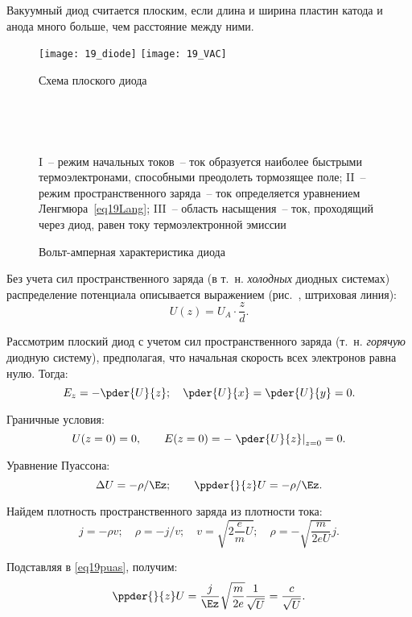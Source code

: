 
Вакуумный диод считается плоским, если длина и ширина пластин катода и анода
много больше, чем расстояние между ними.
\begin{figure}[h!]
  \center
  \texttt{[image: 19\_diode]} \hspace{1em}
  \texttt{[image: 19\_VAC]} \\
  \parbox{.3\textwidth}{\caption{Схема плоского диода} \label{pic19diode}}
    \hspace{1em}
  \parbox{.45\textwidth}{\caption{Вольт-амперная характеристика диода}
    \label{pic19VAC}} \\
  \parbox{.35\textwidth}{\ } \hspace{1em}
  \parbox{.6\textwidth}{\footnotesize I~-- режим начальных токов~-- ток
    образуется наиболее быстрыми термоэлектронами, способными преодолеть
    тормозящее поле; II~-- режим пространственного заряда~-- ток определяется
    уравнением Ленгмюра~\eqref{eq19Lang}; III~-- область насыщения~-- ток,
    проходящий через диод, равен току термоэлектронной эмиссии}
\end{figure}

Без учета сил пространственного заряда (в т.~н. \emph{холодных} диодных
системах) распределение потенциала описывается выражением (рис.~,
штриховая линия):
\[
  U(z) = U_A \cdot \frac{z}{d}.
\]

Рассмотрим плоский диод с учетом сил пространственного заряда (т.~н.
\emph{горячую} диодную систему), предполагая, что начальная скорость всех
электронов равна нулю. Тогда:
\[
  E_z = -\pder{U}{z}; \quad \pder{U}{x} = \pder{U}{y} = 0.
\]

Граничные условия:
\[
  U(z = 0) = 0, \qquad E(z = 0) = -\left. \pder{U}{z} \right|_{z = 0} = 0.
\]

Уравнение Пуассона:
\begin{equation}
  \D U = -\rho / \Ez; \qquad \ppder{}{z}U = -\rho / \Ez.
  \label{eq19puas}
\end{equation}

Найдем плотность пространственного заряда из плотности тока:
\[
  j = -\rho v; \quad \rho = -j / v; \quad v = \sqrt{2 \frac{e}{m} U}; \quad
    \rho = -\sqrt{\frac{m}{2eU}} j.
\]

Подставляя в \eqref{eq19puas}, получим:
\[
  \ppder{}{z} U = \frac{j}{\Ez} \sqrt{\frac{m}{2e}} \frac{1}{\sqrt{U}} =
    \frac{c}{\sqrt{U}}.
\]

